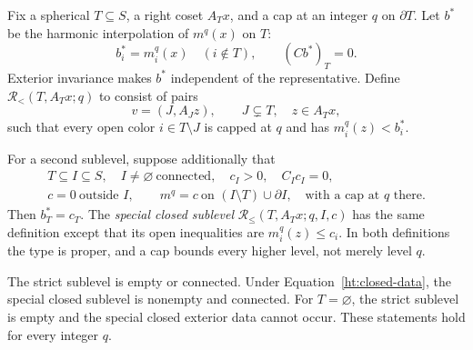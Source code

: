 Fix a spherical \(T\subseteq S\), a right coset \(A_Tx\), and a cap at an
integer \(q\) on \(\partial T\).  Let \(b^*\) be the harmonic interpolation
of \(m^q(x)\) on \(T\):
\[
 b_i^*=m_i^q(x)\quad(i\notin T),\qquad (Cb^*)_T=0.
\]
Exterior invariance makes \(b^*\) independent of the representative.
Define \(\mathcal R_{<}(T,A_Tx;q)\) to consist of pairs
\[
 v=(J,A_Jz),\qquad J\subsetneq T,\quad z\in A_Tx,
\]
such that every open color \(i\in T\setminus J\) is capped at \(q\) and
has \(m_i^q(z)<b_i^*\).

For a second sublevel, suppose additionally that
\begin{equation}
 \begin{gathered}
 T\subseteq I\subseteq S,\quad I\ne\varnothing\ \text{connected},
 \quad c_I>0,\quad C_Ic_I=0,\\
 c=0\ \text{outside }I,\qquad
 m^q=c\ \text{on }(I\setminus T)\cup\partial I,
 \quad\text{with a cap at }q\text{ there}.
 \end{gathered}
 \label{ht:closed-data}
\end{equation}
Then \(b_T^*=c_T\).  The \emph{special closed sublevel}
\(\mathcal R_{\le}(T,A_Tx;q,I,c)\) has the same definition except that its
open inequalities are \(m_i^q(z)\le c_i\).  In both definitions the type is
proper, and a cap bounds every higher level, not merely level \(q\).

\begin{proposition}
\label{ht:sublevels}
The strict sublevel is empty or connected.  Under
Equation~\eqref{ht:closed-data}, the special closed sublevel is nonempty
and connected.  For \(T=\varnothing\), the strict sublevel is empty and
the special closed exterior data cannot occur.  These statements hold
for every integer \(q\).
\end{proposition}

